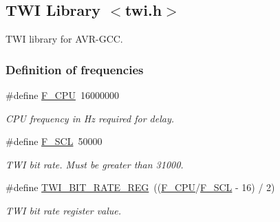 \hypertarget{a00008}{}\subsection{T\+WI Library $<$twi.\+h$>$}
\label{a00008}


T\+WI library for A\+V\+R-\/\+G\+CC.  


\subsubsection*{Definition of frequencies}
\begin{DoxyCompactItemize}
\item 
\#define \hyperlink{a00008_ga43bafb28b29491ec7f871319b5a3b2f8}{F\+\_\+\+C\+PU}~16000000\hypertarget{a00008_ga43bafb28b29491ec7f871319b5a3b2f8}{}\label{a00008_ga43bafb28b29491ec7f871319b5a3b2f8}

\begin{DoxyCompactList}\small\item\em C\+PU frequency in Hz required for delay. \end{DoxyCompactList}\item 
\#define \hyperlink{a00008_ga7a1c522bed64982971384489ee477bd3}{F\+\_\+\+S\+CL}~50000\hypertarget{a00008_ga7a1c522bed64982971384489ee477bd3}{}\label{a00008_ga7a1c522bed64982971384489ee477bd3}

\begin{DoxyCompactList}\small\item\em T\+WI bit rate. Must be greater than 31000. \end{DoxyCompactList}\item 
\#define \hyperlink{a00008_ga801c158406ca2334b446e442a2debe37}{T\+W\+I\+\_\+\+B\+I\+T\+\_\+\+R\+A\+T\+E\+\_\+\+R\+EG}~((\hyperlink{a00008_ga43bafb28b29491ec7f871319b5a3b2f8}{F\+\_\+\+C\+PU}/\hyperlink{a00008_ga7a1c522bed64982971384489ee477bd3}{F\+\_\+\+S\+CL} -\/ 16) / 2)\hypertarget{a00008_ga801c158406ca2334b446e442a2debe37}{}\label{a00008_ga801c158406ca2334b446e442a2debe37}

\begin{DoxyCompactList}\small\item\em T\+WI bit rate register value. \end{DoxyCompactList}\end{DoxyCompactItemize}
